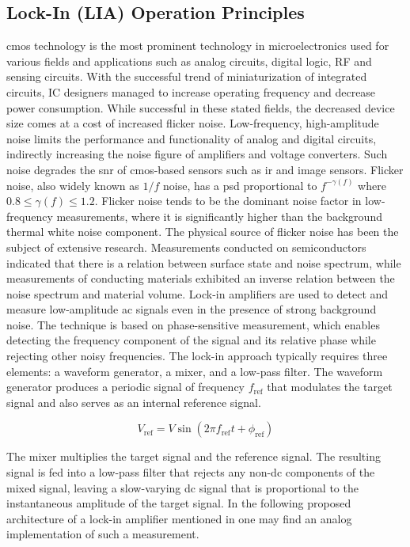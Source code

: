 \subsection{Lock-In (LIA) Operation Principles}
\gls{cmos} technology is the most prominent technology in microelectronics used for
various fields and applications such as analog circuits, digital logic, RF and
sensing circuits. With the successful trend of miniaturization of integrated
circuits, IC designers managed to increase operating frequency and decrease
power consumption. While successful in these stated fields, the decreased device
size comes at a cost of increased flicker noise. Low-frequency, high-amplitude
noise limits the performance and functionality of analog and digital circuits,
indirectly increasing the noise figure of amplifiers and voltage converters. Such
noise degrades the \gls{snr} of \gls{cmos}-based sensors such as \gls{ir} and
image sensors.
Flicker noise, also widely known as $1/f$ noise, has a \gls{psd} proportional to
$f^{-\gamma (f)}$ where $0.8 \leq \gamma (f) \leq 1.2$. Flicker noise tends to
be the dominant noise factor in low-frequency measurements, where it is
significantly higher than the background thermal white noise component. The
physical source of flicker noise has been the subject of extensive research.
Measurements conducted on semiconductors indicated that there is a relation between
surface state and noise spectrum, while measurements of conducting materials
exhibited an inverse relation between the noise spectrum and material volume.
Lock-in amplifiers are used to detect and measure low-amplitude \gls{ac} signals even
in the presence of strong background noise. The technique is based on
phase-sensitive measurement, which enables detecting the frequency component of
the signal and its relative phase while rejecting other noisy frequencies. The
lock-in approach typically requires three elements: a waveform generator, a
mixer, and a low-pass filter. The waveform generator produces a periodic signal
of frequency $f_{\mathrm{ref}}$ that modulates the target signal and also serves as an
internal reference signal.

\begin{equation}
  V_{\mathrm{ref}} = V \sin(2 \pi f_{\mathrm{ref}} t + \phi_{\mathrm{ref}} )
  \label{eq:ref_signal}
\end{equation}

The mixer multiplies the target signal and the reference signal. The resulting
signal is fed into a low-pass filter that rejects any non-\gls{dc} components of the
mixed signal, leaving a slow-varying \gls{dc} signal that is proportional to the
instantaneous amplitude of the target signal. In the following proposed
architecture of a lock-in amplifier mentioned in \cite{lowpower_lia_placeholder}
one may find an analog implementation of such a measurement.

